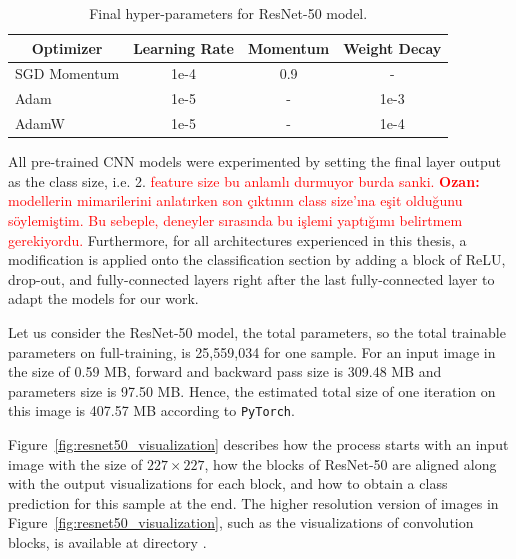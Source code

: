 \begin{table}[h]
\centering
\caption{Final hyper-parameters for ResNet-50 model.}
\label{tab:cnn_hyperparameters}
\begin{tabular}{lccc}
\hline 
\multicolumn{1}{c}{\textbf{Optimizer}} & \textbf{Learning Rate} & \textbf{Momentum} & \textbf{Weight Decay} \\ \hline \hline
SGD Momentum                           & 1e-4                   & 0.9               & -                     \\ 
Adam                                   & 1e-5                   & -                 & 1e-3                     \\ 
AdamW                                  & 1e-5                   & -                 & 1e-4   \\  \hline              
\end{tabular}
\end{table}

All pre-trained CNN models were experimented by setting the final layer output as the class size, i.e. 2. \textcolor{red}{feature size bu anlamlı durmuyor burda sanki. \textbf{Ozan:} modellerin mimarilerini anlatırken son çıktının class size'ına eşit olduğunu söylemiştim. Bu sebeple, deneyler sırasında bu işlemi yaptığımı belirtmem gerekiyordu.} Furthermore, for all architectures experienced in this thesis,  a modification is applied onto the classification section by adding a block of ReLU, drop-out, and fully-connected layers right after the last fully-connected layer to adapt the models for our work.

Let us consider the ResNet-50 model, the total parameters, so the total trainable parameters on full-training, is 25,559,034 for one sample. For an input image in the size of 0.59 MB, forward and backward pass size is 309.48 MB and parameters size is 97.50 MB. Hence, the estimated total size of one iteration on this image is 407.57 MB according to \verb|PyTorch|.

Figure~\ref{fig:resnet50_visualization} describes how the process starts with an input image with the size of $227 \times 227$, how the blocks of ResNet-50 are aligned along with the output visualizations for each block, and how to obtain a class prediction for this sample at the end. The higher resolution version of images in Figure~\ref{fig:resnet50_visualization}, such as the visualizations of convolution blocks, is available at directory \textcolor{blue}{}.


